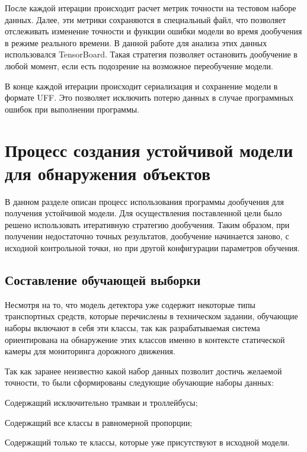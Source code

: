После каждой итерации происходит расчет метрик точности на тестовом наборе данных. Далее, эти метрики сохраняются в специальный файл, что позволяет отслеживать изменение точности и функции ошибки модели во время дообучения в режиме реального времени. В данной работе для анализа этих данных использовался TensorBoard. Такая стратегия позволяет остановить дообучение в любой момент, если есть подозрение на возможное переобучение модели. 

В конце каждой итерации происходит сериализация и сохранение модели в формате UFF. Это позволяет исключить потерю данных в случае программных ошибок при выполнении программы.

\section{Процесс создания устойчивой модели для обнаружения объектов}

В данном разделе описан процесс использования программы дообучения для получения устойчивой модели. Для осуществления поставленной цели было решено использовать итеративную стратегию дообучения. Таким образом, при получении недостаточно точных результатов, дообучение начинается заново, с исходной контрольной точки, но при другой конфигурации параметров обучения.

\subsection{Составление обучающей выборки}

Несмотря на то, что модель детектора уже содержит некоторые типы транспортных средств, которые перечислены в техническом задании, обучающие наборы включают в себя эти классы, так как разрабатываемая система ориентирована на обнаружение этих классов именно в контексте статической камеры для мониторинга дорожного движения. 

Так как заранее неизвестно какой набор данных позволит достичь желаемой точности, то были сформированы следующие обучающие наборы данных:

%
\begin{itemize*}
  \item Содержащий исключительно трамваи и троллейбусы;
  \item Содержащий все классы в равномерной пропорции;
  \item Содержащий только те классы, которые уже присутствуют в исходной модели.
\end{itemize*}
%

